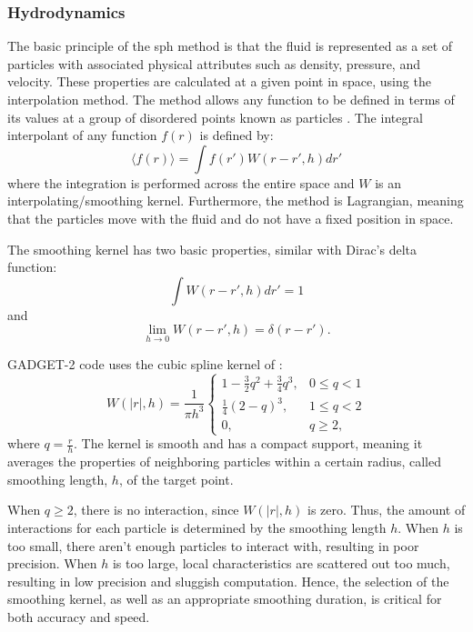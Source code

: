 \subsubsection{Hydrodynamics}

The basic principle of the \ac{sph} method is that the fluid is represented as a set of particles with associated physical attributes such as density, pressure, and velocity. These properties are calculated at a given point in space, using the interpolation method. The method allows any function to be defined in terms of its values at a group of disordered points known as particles \citep{monaghan1982particle}. The integral interpolant of any function $f(r)$ is defined by:
\begin{equation}\label{eq:interpolant}
    \langle f(r) \rangle = \int f(r') W(r-r',h) dr'
\end{equation}
where the integration is performed across the entire space and $W$ is an interpolating/smoothing kernel. Furthermore, the method is Lagrangian, meaning that the particles move with the fluid and do not have a fixed position in space.

The smoothing kernel has two basic properties, similar with Dirac's delta function:
\begin{equation}\label{eq:kernel_property_1}
    \int W(r-r',h) dr' = 1
\end{equation}
and
\begin{equation}\label{eq:kernel_property_2}
   \lim_{h\to0} W(r-r',h) = \delta(r-r').
\end{equation}

GADGET-2 code uses the cubic spline kernel of \cite{monaghan1985refined}:
\begin{equation}\label{eq:spline_kernel}
  W(|r|,h) = \frac{1}{\pi h^3}
    \begin{cases}
      1 - \frac{3}{2}q^2 + \frac{3}{4}q^3, & 0 \leq q < 1\\
      \frac{1}{4}(2 - q)^3, & 1 \leq q <2 \\
      0, &  q \geq 2,
    \end{cases}      
\end{equation}
where $q = \frac{r}{h}$. The kernel is smooth and has a compact support, meaning it averages the properties of neighboring particles within a certain radius, called smoothing length, $h$, of the target point.  

When $q \geq 2$, there is no interaction, since $W(|r|,h)$ is zero. Thus, the amount of interactions for each particle is determined by the smoothing length $h$. When $h$ is too small, there aren't enough particles to interact with, resulting in poor precision. When $h$ is too large, local characteristics are scattered out too much, resulting in low precision and sluggish computation. Hence, the selection of the smoothing kernel, as well as an appropriate smoothing duration, is critical for both accuracy and speed. 

